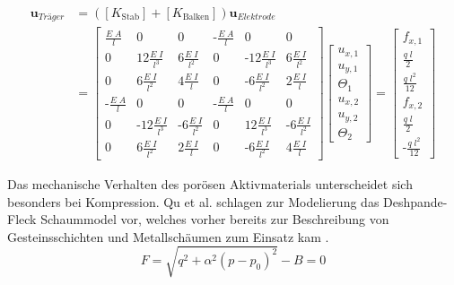 \begin{align}
    [K_{\text{Elektrode}}] \boldsymbol{u}_{Träger} &= ([K_{\text{Stab}}] + [K_{\text{Balken}}])\boldsymbol{u}_{Elektrode}\\
    &= 
    \begin{bmatrix}
        \frac{E \; A}{l} & 0     & 0     &  \text{-}\frac{E \; A}{l}  & 0 & 0 \\
        0 & 12 \frac{E \; I}{l^3}     & 6 \frac{E \; I}{l^2} & 0    &\text{-}12\frac{E \; I}{l^3}  & 6 \frac{E \; I}{l^2}       \\
        0 & 6 \frac{E \; I}{l^2} & 4 \frac{E \; I}{l}  & 0    & \text{-}6 \frac{E \; I}{l^2}  & 2 \frac{E \; I}{l} \\
        \text{-}\frac{E \; A}{l} & 0     & 0     &  \text{-}\frac{E \; A}{l}  & 0 & 0 \\
        0 & \text{-}12\frac{E \; I}{l^3}    & \text{-}6 \frac{E \; I}{l^2}& 0 &12\frac{E \; I}{l^3}   & \text{-}6 \frac{E \; I}{l^2}      \\
        0 & 6 \frac{E \; I}{l^2} & 2 \frac{E \; I}{l} & 0    & \text{-}6 \frac{E \; I}{l^2} & 4 \frac{E \; I}{l}
    \end{bmatrix}
    \begin{bmatrix}
        u_{x,1}  \\
        u_{y,1}  \\
        \Theta_1 \\
        u_{x,2}  \\
        u_{y,2}  \\
        \Theta_2
    \end{bmatrix}
    = 
    \begin{bmatrix}
        f_{x,1} \\
        \frac{q \; l}{2}  \\
        \frac{q \; l^2}{12} \\
        f_{x,2} \\
        \frac{q \; l}{2}  \\
        \text{-}\frac{q \; l^2}{12}
    \end{bmatrix} 
\end{align}



Das mechanische Verhalten des porösen Aktivmaterials unterscheidet sich besonders bei Kompression. Qu et al.  schlagen zur Modelierung das Deshpande-Fleck Schaummodel \cite{Deshpande2000} vor, welches vorher bereits zur Beschreibung von Gesteinsschichten und Metallschäumen zum Einsatz kam \cite{Qu2023}.
\begin{equation}
    F = \sqrt{q^2 + \alpha^2 (p-p_0)^2} - B = 0
\end{equation}

